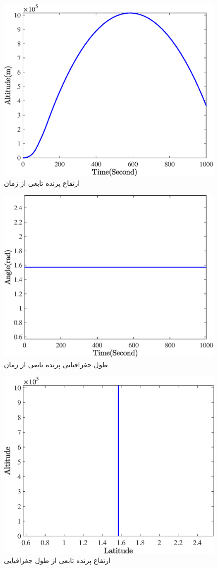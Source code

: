 \begin{figure}[H]
	\centering
	\includegraphics[width=.75\linewidth]{../Figure/Q1/b/alt}
	\caption{ارتفاع پرنده تابعی از زمان}
\end{figure}


\begin{figure}[H]
	\centering
	\includegraphics[width=.75\linewidth]{../Figure/Q1/b/angle}
	\caption{طول جغرافیایی پرنده تابعی از زمان}
\end{figure}


\begin{figure}[H]
	\centering
	\includegraphics[width=.75\linewidth]{../Figure/Q1/b/lat_vs_alt}
	\caption{ارتفاع پرنده تابعی از طول جغرافیایی}
\end{figure}



